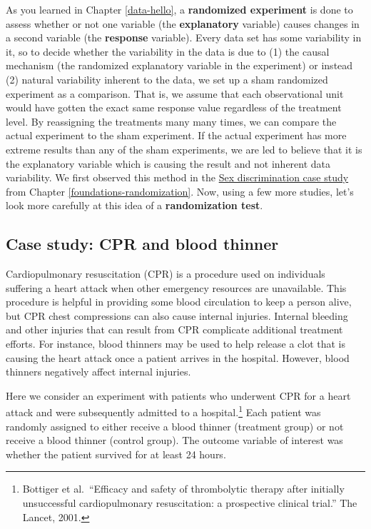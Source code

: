 \documentclass[
  10pt,
  openany]{book}
\theoremstyle{definition}
\theoremstyle{definition}
\theoremstyle{definition}
\theoremstyle{definition}
\theoremstyle{remark}
\begin{document}
As you learned in Chapter \ref{data-hello}, a \textbf{randomized experiment} is done to assess whether or not one variable (the \textbf{explanatory} variable) causes changes in a second variable (the \textbf{response} variable). Every data set has some variability in it, so to decide whether the variability in the data is due to (1) the causal mechanism (the randomized explanatory variable in the experiment) or instead (2) natural variability inherent to the data, we set up a sham randomized experiment as a comparison. That is, we assume that each observational unit would have gotten the exact same response value regardless of the treatment level. By reassigning the treatments many many times, we can compare the actual experiment to the sham experiment. If the actual experiment has more extreme results than any of the sham experiments, we are led to believe that it is the explanatory variable which is causing the result and not inherent data variability. We first observed this method in the \href{caseStudySexDiscrimination}{Sex discrimination case study} from Chapter \ref{foundations-randomization}. Now, using a few more studies, let's look more carefully at this idea of a \textbf{randomization test}.

\subsection{Case study: CPR and blood thinner}\label{cpr}


Cardiopulmonary resuscitation (CPR) is a procedure used on individuals suffering a heart attack when other emergency resources are unavailable. This procedure is helpful in providing some blood circulation to keep a person alive, but CPR chest compressions can also cause internal injuries. Internal bleeding and other injuries that can result from CPR complicate additional treatment efforts. For instance, blood thinners may be used to help release a clot that is causing the heart attack once a patient arrives in the hospital. However, blood thinners negatively affect internal injuries.

Here we consider an experiment with patients who underwent CPR for a heart attack and were subsequently admitted to a hospital.\footnote{B\(\ddot{\text{o}}\)ttiger et al.~``Efficacy and safety of thrombolytic therapy after initially unsuccessful cardiopulmonary resuscitation: a prospective clinical trial.'' The Lancet, 2001.} Each patient was randomly assigned to either receive a blood thinner (treatment group) or not receive a blood thinner (control group). The outcome variable of interest was whether the patient survived for at least 24 hours.
\end{document}
